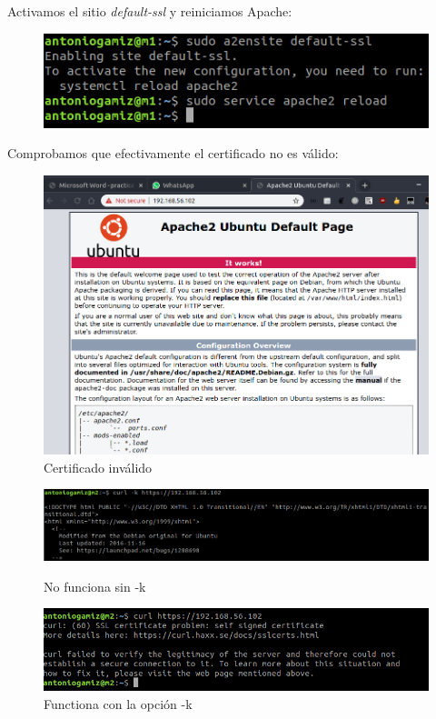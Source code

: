 \documentclass[12pt]{article}
\begin{document}
Activamos el sitio \textit{default-ssl} y reiniciamos Apache:
\begin{figure}[H]
\center
\includegraphics[scale=0.5]{5.png}
\end{figure}

Comprobamos que efectivamente el certificado no es válido:

\begin{figure}[H]
\center
\includegraphics[scale=0.5]{6.png} 
\caption{Certificado inválido}
\end{figure}

\begin{figure}[H]
\center
\includegraphics[scale=0.5]{7.png}
\caption{No funciona sin -k}
\includegraphics[scale=0.5]{8.png}
\caption{Functiona con la opción -k}
\end{figure}
\end{document}
